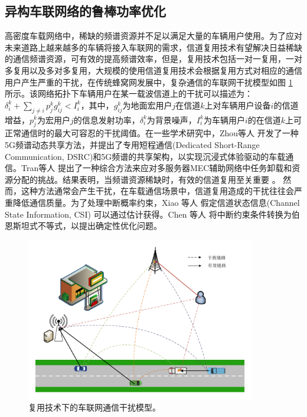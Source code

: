 \subsection{异构车联网络的鲁棒功率优化} \label{section1-2-1}

高密度车载网络中，稀缺的频谱资源并不足以满足大量的车辆用户使用。为了应对未来道路上越来越多的车辆将接入车联网的需求，信道复用技术有望解决日益稀缺的通信频谱资源，可有效的提高频谱效率，但是，复用技术包括一对一复用，一对多复用以及多对多复用，大规模的使用信道复用技术会根据复用方式对相应的通信用户产生严重的干扰，在传统蜂窝网发展中，复杂通信的车联网干扰模型如图 \ref{复用技术下的通信干扰模型} 所示。该网络拓扑下车辆用户在某一载波信道上的干扰可以描述为：$\delta _{i}^{k}+\sum\limits_{j\ne i}{p_{j}^{k}g_{ij}^{k}}<I_{i}^{k}$，其中，$g_{ij}^{k}$为地面宏用户$j$在信道$k$上对车辆用户设备$i$的信道增益，$p_{j}^{k}$为宏用户$j$的信息发射功率，$\delta _{i}^{k}$为背景噪声，$I_{i}^{k}$为车辆用户$i$的在信道$k$上可正常通信时的最大可容忍的干扰阈值。在一些学术研究中，Zhou等人  \supercite{Zhou2017} 开发了一种5G频谱动态共享方法，并提出了专用短程通信(Dedicated Short-Range Communication, DSRC)和5G频谱的共享架构，以实现沉浸式体验驱动的车载通信。Tran等人  \supercite{Tran2019}  提出了一种综合方法来应对多服务器MEC辅助网络中任务卸载和资源分配的挑战。结果表明，当频谱资源稀缺时，有效的信道复用至关重要 \supercite{Liang2021}。 然而，这种方法通常会产生干扰，在车载通信场景中，信道复用造成的干扰往往会严重降低通信质量。为了处理中断概率约束，Xiao 等人 \supercite{Xiao2020} 假定信道状态信息(Channel State Information, CSI) 可以通过估计获得。Chen 等人 \supercite{Chen2022} 将中断约束条件转换为伯恩斯坦式不等式，以提出确定性优化问题。
\begin{figure}[H]
\centering
\includegraphics[width=10cm]{figures//chap1//车联网的干扰模型.pdf}
\caption{复用技术下的车联网通信干扰模型。}
\label{复用技术下的通信干扰模型}
\end{figure}
